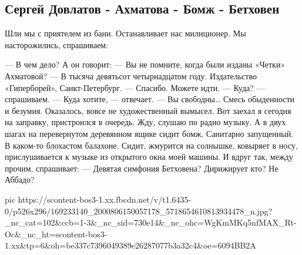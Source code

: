  
 
 
 
 

\subsection{Сергей Довлатов - Ахматова - Бомж - Бетховен}
\label{sec:07_04_2021.fb.morits_junna.1.bethoven_bomzh_dovlatov}

Шли мы с приятелем из бани. Останавливает нас милиционер. Мы насторожились, спрашиваем:

— В чем дело?
А он говорит:
— Вы не помните, когда были изданы «Четки» Ахматовой?
— В тысяча девятьсот четырнадцатом году. Издательство «Гиперборей», Санкт-Петербург.
— Спасибо. Можете идти.
— Куда? — спрашиваем.
— Куда хотите, — отвечает. — Вы свободны…
Смесь обыденности и безумия. Оказалось, вовсе не художественный вымысел. Вот заехал я сегодня на заправку, пристроился в очередь. Жду, слушаю по радио музыку. А в двух шагах на перевернутом деревянном ящике сидит бомж. Санитарно запущенный. В каком-то блохастом балахоне. Сидит, жмурится на солнышке, ковыряет в носу, прислушивается к музыке из открытого окна моей машины. И вдруг так, между прочим, спрашивает:
— Девятая симфония Бетховена? Дирижирует кто? Не Аббадо?

\ifcmt
  pic https://scontent-bos3-1.xx.fbcdn.net/v/t1.6435-0/p526x296/169233140_2000806150057178_5718654610813934478_n.jpg?_nc_cat=102&ccb=1-3&_nc_sid=730e14&_nc_ohc=WgKmMKq5nfMAX_Rt-Oc&_nc_ht=scontent-bos3-1.xx&tp=6&oh=be337c7396049389e26287077b3a32c4&oe=6094BB2A
\fi

